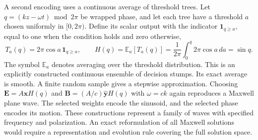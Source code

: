 \documentclass[11pt,letterpaper]{article}
\newcommand{\E}{\mathbf E}
\newcommand{\B}{\mathbf B}
\begin{document}
A second encoding uses a continuous average of threshold trees. Let $q=(kz-\omega t)\bmod 2\pi$ be wrapped phase, and let each tree have a threshold $a$ chosen uniformly in $[0,2\pi)$. Define its scalar output with the indicator $\mathbf1_{q\geq a}$, equal to one when the condition holds and zero otherwise,
\begin{equation}
T_a(q)=2\pi\cos a\,\mathbf1_{q\geq a},\qquad
H(q)=\mathbb E_a[T_a(q)]
=\frac1{2\pi}\int_0^q2\pi\cos a\,da=\sin q.
\end{equation}
The symbol $\mathbb E_a$ denotes averaging over the threshold distribution. This is an explicitly constructed continuous ensemble of decision stumps. Its exact average is smooth. A finite random sample gives a stepwise approximation. Choosing $\E=A\hat{\mathbf x}H(q)$ and $\B=(A/c)\hat{\mathbf y}H(q)$ with $\omega=ck$ again reproduces a Maxwell plane wave. The selected weights encode the sinusoid, and the selected phase encodes its motion. These constructions represent a family of waves with specified frequency and polarization. An exact reformulation of all Maxwell solutions would require a representation and evolution rule covering the full solution space.
\end{document}
